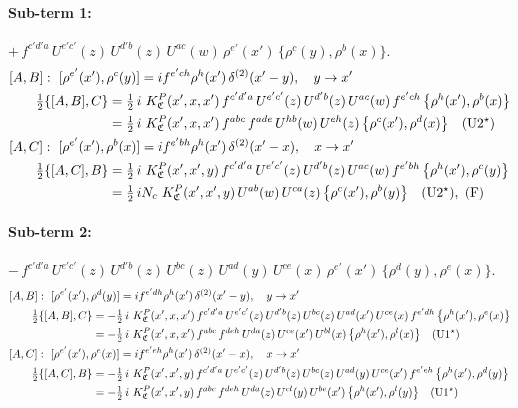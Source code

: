 \documentclass[10pt]{article}
\numberwithin{equation}{section}
\begin{document}
\paragraph{Sub-term 1:} $+\,f^{c'd'a}\,U^{e'c'}(z)\,U^{d'b}(z)\,U^{ac}(w)\,\rho^{e'}(x')\,\big\{\rho^{c}(y),\rho^{b}(x)\big\}$.
\begin{align}
&[A,B]:\ [\rho^{e'}(x'),\rho^{c}(y)]=i f^{e'ch}\rho^{h}(x')\,\delta^{(2)}(x'-y),\quad y\to x'\notag\\
&\qquad \tfrac12\{[A,B],C\}=\tfrac12\,i\,\,K^{P}_{\mathfrak C}(x',x,x')\,f^{c'd'a}\,U^{e'c'}(z)\,U^{d'b}(z)\,U^{ac}(w)\,f^{e'ch}\,\big\{\rho^{h}(x'),\rho^{b}(x)\big\}\notag\\
&\qquad\phantom{\tfrac12\{[A,B],C\}}=\tfrac12\,i\,\,K^{P}_{\mathfrak C}(x',x,x')\,f^{abc}\,f^{ade}\,U^{hb}(w)\,U^{eh}(z)\,\big\{\rho^{c}(x'),\rho^{d}(x)\big\}\quad\text{(U2$^\star$)}
\label{B:eq:GIII.III.P-1-AB}\\
&[A,C]:\ [\rho^{e'}(x'),\rho^{b}(x)]=i f^{e'bh}\rho^{h}(x')\,\delta^{(2)}(x'-x),\quad x\to x'\notag\\
&\qquad \tfrac12\{[A,C],B\}=\tfrac12\,i\,\,K^{P}_{\mathfrak C}(x',x',y)\,f^{c'd'a}\,U^{e'c'}(z)\,U^{d'b}(z)\,U^{ac}(w)\,f^{e'bh}\,\big\{\rho^{h}(x'),\rho^{c}(y)\big\}\notag\\
&\qquad\phantom{\tfrac12\{[A,C],B\}}=\tfrac12\,i N_{c}\,\,K^{P}_{\mathfrak C}(x',x',y)\,U^{ab}(w)\,U^{ca}(z)\,\big\{\rho^{c}(x'),\rho^{b}(y)\big\}\quad\text{(U2$^\star$)},\ \text{(F)}
\label{B:eq:GIII.III.P-1-AC}
\end{align}
\paragraph{Sub-term 2:} $-\,f^{c'd'a}\,U^{e'c'}(z)\,U^{d'b}(z)\,U^{bc}(z)\,U^{ad}(y)\,U^{ce}(x)\,\rho^{e'}(x')\,\big\{\rho^{d}(y),\rho^{e}(x)\big\}$.
\begin{align}
&[A,B]:\ [\rho^{e'}(x'),\rho^{d}(y)]=i f^{e'dh}\rho^{h}(x')\,\delta^{(2)}(x'-y),\quad y\to x'\notag\\
&\qquad \tfrac12\{[A,B],C\}=-\tfrac12\,i\,\,K^{P}_{\mathfrak C}(x',x,x')\,f^{c'd'a}\,U^{e'c'}(z)\,U^{d'b}(z)\,U^{bc}(z)\,U^{ad}(x')\,U^{ce}(x)\,f^{e'dh}\,\big\{\rho^{h}(x'),\rho^{e}(x)\big\}\notag\\
&\qquad\phantom{\tfrac12\{[A,B],C\}}=-\tfrac12\,i\,\,K^{P}_{\mathfrak C}(x',x,x')\,f^{abc}\,f^{deh}\,U^{da}(z)\,U^{ce}(x')\,U^{bl}(x)\,\big\{\rho^{h}(x'),\rho^{l}(x)\big\}\quad\text{(U1$^\star$)}
\label{B:eq:GIII.III.P-2-AB}\\
&[A,C]:\ [\rho^{e'}(x'),\rho^{e}(x)]=i f^{e'eh}\rho^{h}(x')\,\delta^{(2)}(x'-x),\quad x\to x'\notag\\
&\qquad \tfrac12\{[A,C],B\}=-\tfrac12\,i\,\,K^{P}_{\mathfrak C}(x',x',y)\,f^{c'd'a}\,U^{e'c'}(z)\,U^{d'b}(z)\,U^{bc}(z)\,U^{ad}(y)\,U^{ce}(x')\,f^{e'eh}\,\big\{\rho^{h}(x'),\rho^{d}(y)\big\}\notag\\
&\qquad\phantom{\tfrac12\{[A,C],B\}}=-\tfrac12\,i\,\,K^{P}_{\mathfrak C}(x',x',y)\,f^{abc}\,f^{deh}\,U^{da}(z)\,U^{cl}(y)\,U^{be}(x')\,\big\{\rho^{h}(x'),\rho^{l}(y)\big\}\quad\text{(U1$^\star$)}
\label{B:eq:GIII.III.P-2-AC}
\end{align}
\end{document}
